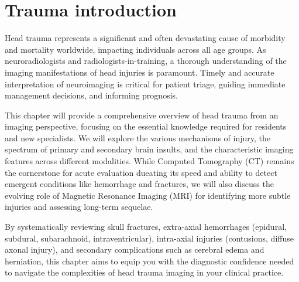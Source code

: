 \chapter{Trauma introduction}
\minitoc

Head trauma represents a significant and often devastating cause of morbidity and mortality worldwide, impacting individuals across all age groups. As neuroradiologists and radiologists-in-training, a thorough understanding of the imaging manifestations of head injuries is paramount. Timely and accurate interpretation of neuroimaging is critical for patient triage, guiding immediate management decisions, and informing prognosis.

This chapter will provide a comprehensive overview of head trauma from an imaging perspective, focusing on the essential knowledge required for residents and new specialists. We will explore the various mechanisms of injury, the spectrum of primary and secondary brain insults, and the characteristic imaging features across different modalities. While Computed Tomography (CT) remains the cornerstone for acute evaluation dueating its speed and ability to detect emergent conditions like hemorrhage and fractures, we will also discuss the evolving role of Magnetic Resonance Imaging (MRI) for identifying more subtle injuries and assessing long-term sequelae.

By systematically reviewing skull fractures, extra-axial hemorrhages (epidural, subdural, subarachnoid, intraventricular), intra-axial injuries (contusions, diffuse axonal injury), and secondary complications such as cerebral edema and herniation, this chapter aims to equip you with the diagnostic confidence needed to navigate the complexities of head trauma imaging in your clinical practice.